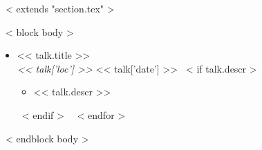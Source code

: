 ~< extends "section.tex" >~

~< block body >~
\begin{itemize}
  ~< for talk in items >~
    \item << talk.title >> \\ \textit{<< talk['loc'] >>} \hfill << talk['date'] >>
    ~< if talk.descr >~
      \begin{itemize}
      \item << talk.descr >>
      \end{itemize}
    ~< endif >~
  ~< endfor >~
\end{itemize}
~< endblock body >~